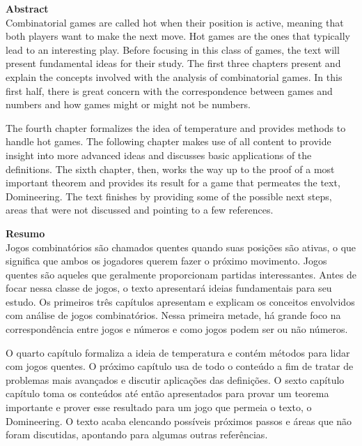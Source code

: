 \newpage

{
\noindent\Large\textbf{Abstract}
}\\


\noindent
Combinatorial games are called hot when their position is active, meaning that both players want to make the next move. Hot games are the ones that typically lead to an interesting play. Before focusing in this class of games, the text will present fundamental ideas for their study. The first three chapters present and explain the concepts involved with the analysis of combinatorial games. In this first half, there is great concern with the correspondence between games and numbers and how games might or might not be numbers.

The fourth chapter formalizes the idea of temperature and provides methods to handle hot games. The following chapter makes use of all content to provide insight into more advanced ideas and discusses basic applications of the definitions. The sixth chapter, then, works the way up to the proof of a most important theorem and provides its result for a game that permeates the text, Domineering. The text finishes by providing some of the possible next steps, areas that were not discussed and pointing to a few references.

\newpage

{
\noindent\Large\textbf{Resumo}
}\\


\noindent
Jogos combinatórios são chamados quentes quando suas posições são ativas, o que significa que ambos os jogadores querem fazer o próximo movimento. Jogos quentes são aqueles que geralmente proporcionam partidas interessantes. Antes de focar nessa classe de jogos, o texto apresentará ideias fundamentais para seu estudo. Os primeiros três capítulos apresentam e explicam os conceitos envolvidos com análise de jogos combinatórios. Nessa primeira metade, há grande foco na correspondência entre jogos e números e como jogos podem ser ou não números.


O quarto capítulo formaliza a ideia de temperatura e contém métodos para lidar com jogos quentes. O próximo capítulo usa de todo o conteúdo a fim de tratar de problemas mais avançados e discutir aplicações das definições. O sexto capítulo capítulo toma os conteúdos até então apresentados para provar um teorema importante e prover esse resultado para um jogo que permeia o texto, o Domineering. O texto acaba elencando possíveis próximos passos e áreas que não foram discutidas, apontando para algumas outras referências.